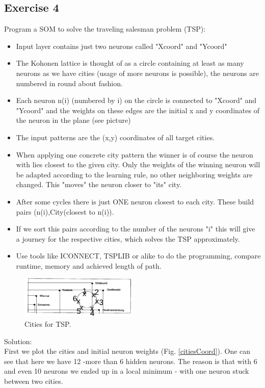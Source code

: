 \documentclass[a4paper, 12pt]{article}
\begin{document}
\subsection{Exercise 4}
Program a SOM to solve the traveling salesman problem (TSP):
\begin{itemize}
\item  Input layer contains just two neurons called "Xcoord" and "Ycoord"
\item The Kohonen lattice is thought of as a circle containing at least as many neurons as we have cities (usage of more neurons is possible), the neurons are numbered in round about fashion.
\item Each neuron n(i) (numbered by i) on the circle is connected to "Xcoord" and "Ycoord" and the weights on these edges are the initial x and y coordinates of the neuron in the plane (see picture)
\item The input patterns are the (x,y) coordinates of all target cities.
\item When applying one concrete city pattern the winner is of course the neuron with lies closest to the given city. Only the weights of the winning neuron will be adapted according to the learning rule, no other neighboring weights are changed. This "moves" the neuron closer to "its" city.
\item After some cycles there is just ONE neuron closest to each city. These build pairs (n(i),City(closest to n(i)).
\item If we sort this pairs according to the number of the neurons "i" this will give a journey for the respective cities, which solves the TSP approximately. 
\item Use tools like ICONNECT, TSPLIB or alike to do the programming, compare runtime, memory and achieved length of path.
\end{itemize}

\begin{figure}[h]
  \centering
  \caption{Cities for TSP.\label{cities}}
  \includegraphics[width=0.5\textwidth]{cities}
\end{figure}


Solution:\\

First we plot the cities and initial neuron weights (Fig. \ref{citiesCoord}). One can see that here we have 12 -more than 6 hidden neurons. The reason is that with 6 and even 10 neurons we ended up in a local minimum - with one neuron stuck between two cities.
\end{document}
